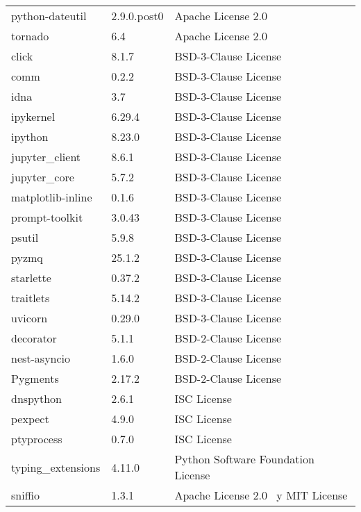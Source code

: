 \begin{ThreePartTable}
\begin{longtable}{llp{7cm}}
    python-dateutil & 2.9.0.post0 &  Apache License 2.0\tnote{b} \\ 
    tornado & 6.4 &  Apache License 2.0\tnote{b} \\ 
    click & 8.1.7 & BSD-3-Clause License\tnote{d} \\ 
    comm & 0.2.2 & BSD-3-Clause License\tnote{d} \\ 
    idna & 3.7 & BSD-3-Clause License\tnote{d} \\ 
    ipykernel & 6.29.4 & BSD-3-Clause License\tnote{d} \\ 
    ipython & 8.23.0 & BSD-3-Clause License\tnote{d} \\ 
    jupyter\_client & 8.6.1 & BSD-3-Clause License\tnote{d} \\ 
    jupyter\_core & 5.7.2 & BSD-3-Clause License\tnote{d} \\ 
    matplotlib-inline & 0.1.6 & BSD-3-Clause License\tnote{d} \\ 
    prompt-toolkit & 3.0.43 & BSD-3-Clause License\tnote{d} \\ 
    psutil & 5.9.8 & BSD-3-Clause License\tnote{d} \\ 
    pyzmq & 25.1.2 & BSD-3-Clause License\tnote{d} \\ 
    starlette & 0.37.2 & BSD-3-Clause License\tnote{d} \\ 
    traitlets & 5.14.2 & BSD-3-Clause License\tnote{d} \\ 
    uvicorn & 0.29.0 & BSD-3-Clause License\tnote{d} \\ 
    decorator & 5.1.1 & BSD-2-Clause License\tnote{c} \\ 
    nest-asyncio & 1.6.0 & BSD-2-Clause License\tnote{c} \\ 
    Pygments & 2.17.2 & BSD-2-Clause License\tnote{c} \\ 
    dnspython & 2.6.1 & ISC License\tnote{e} \\ 
    pexpect & 4.9.0 & ISC License\tnote{e} \\ 
    ptyprocess & 0.7.0 & ISC License\tnote{e} \\ 
    typing\_extensions & 4.11.0 & Python Software Foundation License\tnote{f} \\ 
    sniffio & 1.3.1 & Apache License 2.0\tnote{b} ~y MIT License\tnote{a} \\
\end{longtable}
\end{ThreePartTable}



